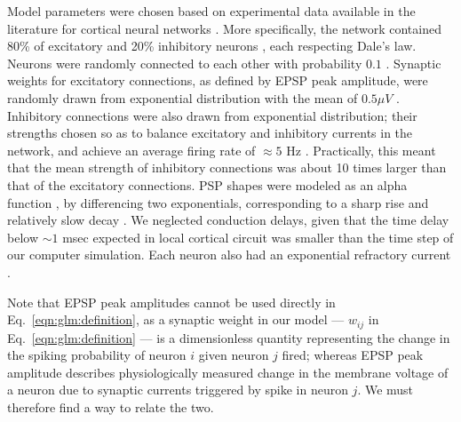 Model parameters were chosen based on experimental data available in the literature for cortical neural networks \cite{Braitenberg1998,Urquijo2000,Lefort2009,Sayer1990}. More specifically, the network contained 80\% of excitatory and 20\% inhibitory neurons \cite{Braitenberg1998,Urquijo2000}, each respecting Dale's law. Neurons were randomly connected to each other with probability $0.1$ \cite{Braitenberg1998,Lefort2009}. Synaptic weights for excitatory connections, as defined by EPSP peak amplitude, were randomly drawn from exponential distribution with the mean of $0.5 \mu V$ \cite{Lefort2009,Sayer1990}. Inhibitory connections were also drawn from exponential distribution; their strengths chosen so as to balance excitatory and inhibitory currents in the network, and achieve an average firing rate of $\approx 5 $ Hz \cite{Abeles91}. Practically, this meant that the mean strength of inhibitory connections was about 10 times larger than that of the excitatory connections. PSP shapes were modeled as an alpha function \cite{Koch99}, by differencing two exponentials, corresponding to a sharp rise and relatively slow decay \cite{Sayer1990}. We neglected conduction delays, given that the time delay below $\sim 1$ msec expected in local cortical circuit was smaller than the time step of our computer simulation. Each neuron also had an exponential refractory current \cite{Koch99}.

Note that EPSP peak amplitudes cannot be used directly in Eq.~\eqref{eqn:glm:definition}, as a synaptic weight in our model --- $w_{ij}$ in Eq.~\eqref{eqn:glm:definition} --- is a dimensionless quantity representing the change in the spiking probability of neuron $i$ given neuron $j$ fired; whereas EPSP peak amplitude describes physiologically measured change in the membrane voltage of a neuron due to synaptic currents triggered by spike in neuron $j$. We must therefore find a way to relate the two.

